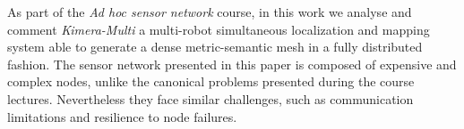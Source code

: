 As part of the \emph{Ad hoc sensor network} course, in this work we analyse and
comment \emph{Kimera-Multi} a multi-robot simultaneous localization and mapping
system able to generate a dense metric-semantic mesh in a fully distributed
fashion. The sensor network presented in this paper is composed of expensive
and complex nodes, unlike the canonical problems presented during the course
lectures. Nevertheless they face similar challenges, such as communication
limitations and resilience to node failures.